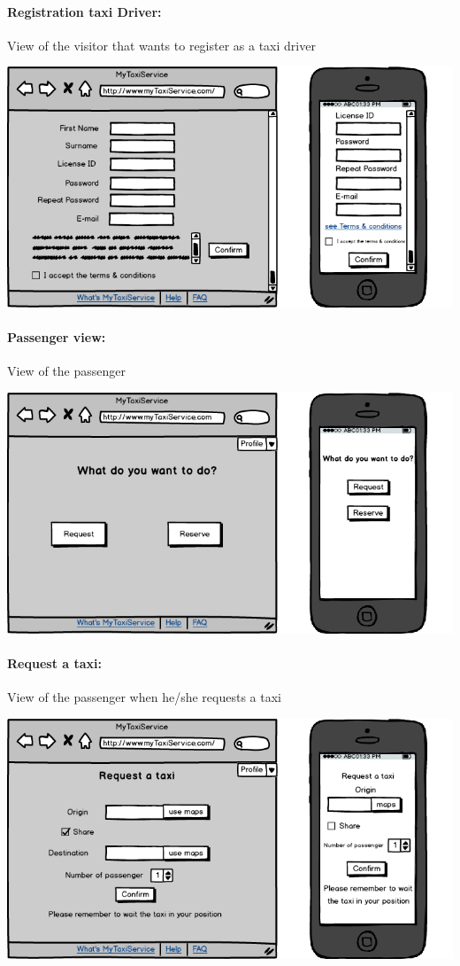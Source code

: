 \paragraph{Registration taxi Driver:}
	View of the visitor that wants to register as a taxi driver
\begin{center}
	\includegraphics[width=\textwidth]{mockup/registrationTaxiDriver.png}
\end{center}
\newpage
\paragraph{Passenger view:}
View of the passenger
\begin{center}
	\includegraphics[width=\textwidth]{mockup/passengersView.png}
\end{center}

\paragraph{Request a taxi:}
View of the passenger when he/she requests a taxi
\begin{center}
	\includegraphics[width=\textwidth]{mockup/request.png}
\end{center}
\newpage
